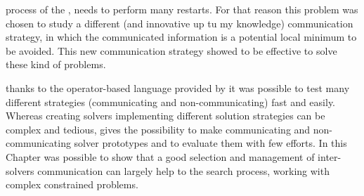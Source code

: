  process of the \grp{}, \posl{} needs to perform many restarts. For that reason this problem was chosen to study a different (and innovative up tu my knowledge) communication strategy, in which the communicated information is a potential local minimum to be avoided. This new communication strategy showed to be effective to solve these kind of problems.

 thanks to the operator-based language provided by \posl{} it was possible to test many different strategies (communicating and non-communicating) fast and easily. Whereas creating solvers implementing different solution strategies can be complex and tedious, \posl{} gives the possibility to make communicating and non-communicating solver prototypes and to evaluate them with few efforts. In this Chapter was possible to show that a good selection and management of inter-solvers communication can largely help to the search process, working with complex constrained problems.
